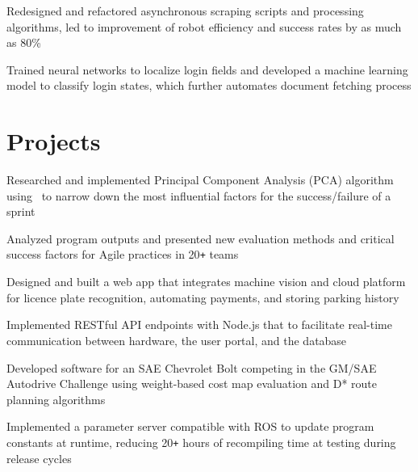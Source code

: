 \documentclass{mxresume}
\begin{document}
\begin{minipage}[t]{0.72\textwidth}
\begin{resumebody}
\begin{large}
\begin{tightemize}{5mm}
\end{tightemize}
%
%
\begin{tightemize}{5mm}
\item Redesigned and refactored asynchronous scraping scripts and processing algorithms, led to improvement of robot efficiency and success rates by as much as 80\textsc{\%}
\item Trained neural networks to localize login fields and developed a machine learning model to classify login states, which further automates document fetching process
\end{tightemize}
%
%
\section*{Projects}
%
\begin{tightemize}{5mm}
\item Researched and implemented Principal Component Analysis (PCA) algorithm using \Csharp\ to narrow down the most influential factors for the success/failure of a sprint
\item Analyzed program outputs and presented new evaluation methods and critical success factors for Agile practices in 20\texttt{+} teams
\end{tightemize}
%
%
\begin{tightemize}{5mm}
\item Designed and built a web app that integrates machine vision and cloud platform for licence plate recognition, automating payments, and storing parking history
\item Implemented RESTful API endpoints with Node.js that to facilitate real-time communication between hardware, the user portal, and the database
\end{tightemize}
%
%
\begin{tightemize}{5mm}
\item Developed software for an SAE Chevrolet Bolt competing in the GM/SAE Autodrive Challenge using weight-based cost map evaluation and D* route planning algorithms
\item Implemented a parameter server compatible with ROS to update program constants at runtime, reducing 20\texttt{+} hours of recompiling time at testing during release cycles
\end{tightemize}
\end{large}
\end{resumebody}
\end{minipage}
\hfill
\end{document}
